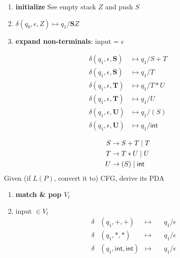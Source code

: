 {\footnotesize
\begin{minipage}{\linewidth}
\begin{enumerate}
\item \textbf{initialize} See empty stack \(Z\) and push \(S\)
\item[] \(\delta(q_{0},\epsilon,Z) \mapsto q_{1}/\mathbf{S}Z\)
\item \textbf{expand non-terminals}: input = \(\epsilon\)
\end{enumerate}
\end{minipage}
\begin{minipage}[t]{0.45\linewidth}
  \setlength{\abovedisplayskip}{1pt}
  \setlength{\belowdisplayskip}{1pt}
  \begin{align*}
   \delta(q_{1},\epsilon,\mathbf{S})& \mapsto q_{1}/S+T\\
   \delta(q_{1},\epsilon,\mathbf{S})& \mapsto q_{1}/T\\
   \delta(q_{1},\epsilon,\mathbf{T})& \mapsto q_{1}/T * U\\
   \delta(q_{1},\epsilon,\mathbf{T})& \mapsto q_{1}/U\\
   \delta(q_{1},\epsilon,\mathbf{U})& \mapsto q_{1}/(S)\\
   \delta(q_{1},\epsilon,\mathbf{U})& \mapsto q_{1}/\mathsf{int}
  \end{align*}
\end{minipage}
\begin{minipage}[t]{0.45\linewidth}
\begin{align*}
  S &\rightarrow S + T \;|\; T\\
  T &\rightarrow T * U \;|\; U\\
  U &\rightarrow (S) \;|\; \mathsf{int}
\end{align*}
Given (if \(L(P)\), convert it to) CFG, derive its PDA
\end{minipage}
\begin{minipage}[t]{0.4\linewidth}
\begin{enumerate}[resume,start=3]
\item \textbf{match \& pop \(V_{t}\)}
\item[] input \(\in V_{t}\)
  \begin{align*}
  \delta&(q_{1},\mathbf{+},\mathbf{+})& \mapsto &\quad q_{1}/\epsilon\\
  \delta&(q_{1},\mathbf{*},\mathbf{*})& \mapsto &\quad q_{1}/\epsilon\\
  \delta&(q_{1},\mathsf{int},\mathsf{int})& \mapsto &\quad q_{1}/\epsilon\\

\end{align*}
\end{enumerate}
\end{minipage}}
